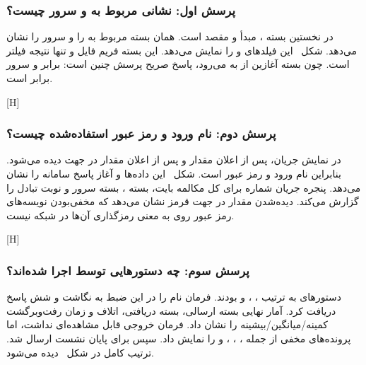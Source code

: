 \subsubsection{پرسش اول: نشانی  مربوط به  و سرور چیست؟}

در نخستین بسته ، مبدأ  و مقصد  است. همان بسته
 مربوط به  را  و  سرور را  نشان می‌دهد.
شکل~ این فیلدهای  و  را نمایش می‌دهد.
این بسته فریم  فایل و تنها نتیجه فیلتر
 است. چون بسته
آغازین از  به  می‌رود، پاسخ صریح پرسش چنین است:
 برابر  و سرور برابر  است.

[H]

\subsubsection{پرسش دوم: نام ورود و رمز عبور استفاده‌شده چیست؟}

در نمایش  جریان، پس از اعلان  مقدار  و پس از اعلان
 مقدار  در جهت  دیده می‌شود. بنابراین نام ورود  و رمز
عبور  است. شکل~ این داده‌ها و آغاز پاسخ سامانه
 را نشان می‌دهد. پنجره جریان شماره  برای کل مکالمه  بایت،
 بسته ،  بسته سرور و  نوبت تبادل را گزارش می‌کند. دیده‌شدن مقدار
 در جهت قرمز نشان می‌دهد که مخفی‌بودن نویسه‌های رمز عبور روی  به معنی رمزگذاری
آن‌ها در شبکه نیست.

[H]

\subsubsection{پرسش سوم: چه دستورهایی توسط  اجرا شده‌اند؟}

دستورهای  به ترتیب ، ،  و 
بودند. فرمان  نام  را در این ضبط به  نگاشت و
شش پاسخ  دریافت کرد. آمار نهایی  بسته ارسالی،  بسته دریافتی،
 اتلاف و زمان رفت‌وبرگشت کمینه/میانگین/بیشینه
 را نشان داد. فرمان  خروجی قابل مشاهده‌ای نداشت، اما
 پرونده‌های مخفی از جمله ، ، ،
 و  را نمایش داد. سپس  برای پایان نشست ارسال شد. ترتیب کامل
در شکل~ دیده می‌شود.

